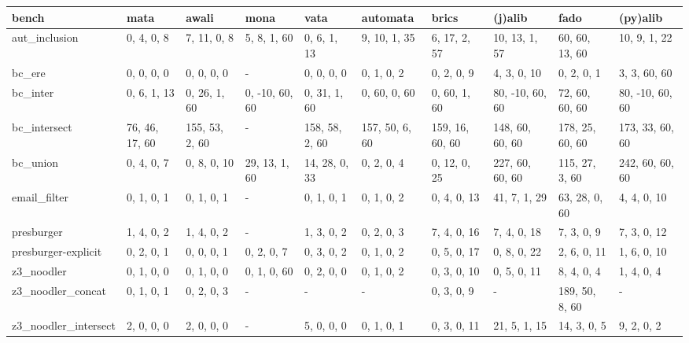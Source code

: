 \begin{tabular}{llllllllll}
\hline
 bench                & mata           & awali          & mona           & vata           & automata       & brics           & (j)alib         & fado            & (py)alib        \\
\hline
 aut_inclusion        & 0, 4, 0, 8     & 7, 11, 0, 8    & 5, 8, 1, 60    & 0, 6, 1, 13    & 9, 10, 1, 35   & 6, 17, 2, 57    & 10, 13, 1, 57   & 60, 60, 13, 60  & 10, 9, 1, 22    \\
 bc_ere               & 0, 0, 0, 0     & 0, 0, 0, 0     & -              & 0, 0, 0, 0     & 0, 1, 0, 2     & 0, 2, 0, 9      & 4, 3, 0, 10     & 0, 2, 0, 1      & 3, 3, 60, 60    \\
 bc_inter             & 0, 6, 1, 13    & 0, 26, 1, 60   & 0, -10, 60, 60 & 0, 31, 1, 60   & 0, 60, 0, 60   & 0, 60, 1, 60    & 80, -10, 60, 60 & 72, 60, 60, 60  & 80, -10, 60, 60 \\
 bc_intersect         & 76, 46, 17, 60 & 155, 53, 2, 60 & -              & 158, 58, 2, 60 & 157, 50, 6, 60 & 159, 16, 60, 60 & 148, 60, 60, 60 & 178, 25, 60, 60 & 173, 33, 60, 60 \\
 bc_union             & 0, 4, 0, 7     & 0, 8, 0, 10    & 29, 13, 1, 60  & 14, 28, 0, 33  & 0, 2, 0, 4     & 0, 12, 0, 25    & 227, 60, 60, 60 & 115, 27, 3, 60  & 242, 60, 60, 60 \\
 email_filter         & 0, 1, 0, 1     & 0, 1, 0, 1     & -              & 0, 1, 0, 1     & 0, 1, 0, 2     & 0, 4, 0, 13     & 41, 7, 1, 29    & 63, 28, 0, 60   & 4, 4, 0, 10     \\
 presburger           & 1, 4, 0, 2     & 1, 4, 0, 2     & -              & 1, 3, 0, 2     & 0, 2, 0, 3     & 7, 4, 0, 16     & 7, 4, 0, 18     & 7, 3, 0, 9      & 7, 3, 0, 12     \\
 presburger-explicit  & 0, 2, 0, 1     & 0, 0, 0, 1     & 0, 2, 0, 7     & 0, 3, 0, 2     & 0, 1, 0, 2     & 0, 5, 0, 17     & 0, 8, 0, 22     & 2, 6, 0, 11     & 1, 6, 0, 10     \\
 z3_noodler           & 0, 1, 0, 0     & 0, 1, 0, 0     & 0, 1, 0, 60    & 0, 2, 0, 0     & 0, 1, 0, 2     & 0, 3, 0, 10     & 0, 5, 0, 11     & 8, 4, 0, 4      & 1, 4, 0, 4      \\
 z3_noodler_concat    & 0, 1, 0, 1     & 0, 2, 0, 3     & -              & -              & -              & 0, 3, 0, 9      & -               & 189, 50, 8, 60  & -               \\
 z3_noodler_intersect & 2, 0, 0, 0     & 2, 0, 0, 0     & -              & 5, 0, 0, 0     & 0, 1, 0, 1     & 0, 3, 0, 11     & 21, 5, 1, 15    & 14, 3, 0, 5     & 9, 2, 0, 2      \\
\hline
\end{tabular}